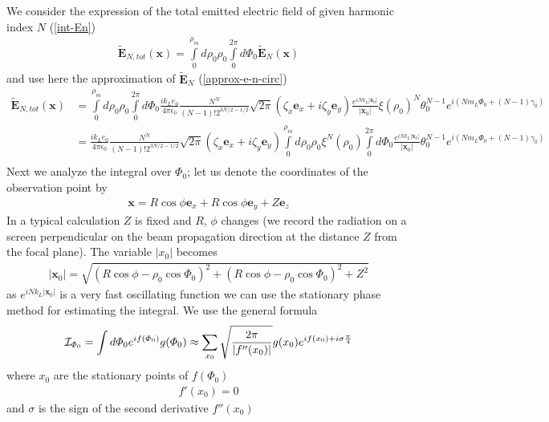 We consider the expression of the total emitted electric field of given harmonic index $N$ (\ref{int-En})
\begin{align}
    \tilde {\bm E}_{N,tot}({\bm x})=\int\limits_0^{\rho_m}d\rho_0\rho_0\int\limits_0^{2\pi}d\varPhi_0 \tilde{\bm E}_N({\bm x})
\end{align}
and use here the approximation of $\tilde{\bm E}_N$ (\ref{approx-e-n-circ})
\begin{align}
    \tilde {\bm E}_{N,tot}({\bm x}) & =\int\limits_0^{\rho_m}d\rho_0\rho_0\int\limits_0^{2\pi}d\varPhi_0  \frac{i k_L  e_0}{4\pi\epsilon_0}\frac{N^N}{(N-1)!2^{3N/2-1/2}}\sqrt{2\pi}(\zeta_x{\bm e}_x+i \zeta_y{\bm e}_y)\frac{e^{iNk_L|{\bm x}_0|}}{|{\bm x}_0|}\xi(\rho_0)^N\theta_0^{N-1}e^{i(Nm_L\varPhi_0+(N-1)\gamma_0)}\nonumber \\
                                    & =\frac{i k_L  e_0}{4\pi\epsilon_0}\frac{N^N}{(N-1)!2^{3N/2-1/2}}\sqrt{2\pi}(\zeta_x{\bm e}_x+i \zeta_y{\bm e}_y)\int\limits_0^{\rho_m}d\rho_0\rho_0\xi^N(\rho_0)\int\limits_0^{2\pi}d\varPhi_0  \frac{e^{iNk_L|{\bm x}_0|}}{|{\bm x}_0|}\theta_0^{N-1}e^{i(Nm_L\varPhi_0+(N-1)\gamma_0)}\nonumber \\
\end{align}
Next we analyze  the integral over $\varPhi_0$; let us denote the coordinates of the observation point by
\begin{align}
    {\bm x}=R\cos\phi{\bm e}_x+R\cos\phi{\bm e}_y+Z{\bm e}_z
\end{align}
In a typical calculation $Z$ is fixed and $R$, $\phi$ changes (we record the radiation on a screen perpendicular on the beam propagation direction at the distance $Z$ from the focal plane).
The variable $|x_0|$  becomes
\begin{align}
    |{\bm x}_0|=\sqrt{(R\cos\phi-\rho_0\cos\varPhi_0)^2+(R\cos\phi-\rho_0\cos\varPhi_0)^2+Z^2}
\end{align}
as $e^{iNk_L|{\bm x}_0|}$ is a very fast oscillating function we can use the stationary phase method for estimating the integral.
We use the general formula \cite{ref2}
\begin{align}
    {\cal I}_{\varPhi_0}= \int d\varPhi_0 e^{if(\varPhi_0)} g(\varPhi_0)\approx\sum\limits_{x_0}\sqrt\frac{2\pi}{|f''(x_0)|}g(x_0)e^{if(x_0)+i\sigma\frac{\pi}4}
\end{align}
where $x_0$ {are} the stationary points of $f(\varPhi_0)$
\begin{align}
    f'(x_0)=0
\end{align}
and $\sigma$ is the sign of the second derivative $f''(x_0)$

